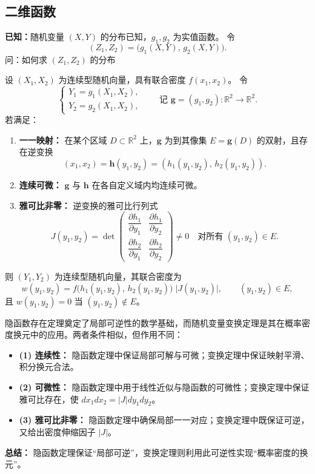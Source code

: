 \subsection{二维函数}
\textbf{已知：}随机变量 $(X,Y)$ 的分布已知，$g_1,g_2$ 为实值函数。
令
\[
(Z_1,Z_2) = \bigl(g_1(X,Y),\, g_2(X,Y)\bigr).
\]
问：如何求 $(Z_1,Z_2)$ 的分布
\begin{theorem}[换元的条件与操作]
设 $(X_1,X_2)$ 为连续型随机向量，具有联合密度 $f(x_1,x_2)$。
令
\[
\begin{cases}
Y_1 = g_1(X_1,X_2),\\
Y_2 = g_2(X_1,X_2),
\end{cases}
\qquad
\text{记 } \mathbf{g}=(g_1,g_2):\mathbb{R}^2\to\mathbb{R}^2.
\]
若满足：
\begin{enumerate}[(1)]
  \item \textbf{一一映射：} 在某个区域 $D\subset\mathbb{R}^2$ 上，$\mathbf{g}$ 为到其像集 $E=\mathbf{g}(D)$ 的双射，且存在逆变换
  \[
  (x_1,x_2)=\mathbf{h}(y_1,y_2)=(h_1(y_1,y_2),\,h_2(y_1,y_2)).
  \]
  \item \textbf{连续可微：} $\mathbf{g}$ 与 $\mathbf{h}$ 在各自定义域内均连续可微。
  \item \textbf{雅可比非零：} 逆变换的雅可比行列式
  \[
  J(y_1,y_2)=
  \det
  \begin{pmatrix}
    \dfrac{\partial h_1}{\partial y_1} & \dfrac{\partial h_1}{\partial y_2}\\[8pt]
    \dfrac{\partial h_2}{\partial y_1} & \dfrac{\partial h_2}{\partial y_2}
  \end{pmatrix}
  \neq 0 \quad \text{对所有 } (y_1,y_2)\in E.
  \]
\end{enumerate}
则 $(Y_1,Y_2)$ 为连续型随机向量，其联合密度为
\[
w(y_1,y_2)
= f\!\big(h_1(y_1,y_2),\,h_2(y_1,y_2)\big)\;\big|J(y_1,y_2)\big|,
\qquad (y_1,y_2)\in E,
\]
且 $w(y_1,y_2)=0$ 当 $(y_1,y_2)\notin E$。
\end{theorem}
\begin{note}
隐函数存在定理奠定了局部可逆性的数学基础，而随机变量变换定理是其在概率密度换元中的应用。两者条件相似，但作用不同：

\begin{itemize}
  \item \textbf{(1) 连续性：}  
  隐函数定理中保证局部可解与可微；变换定理中保证映射平滑、积分换元合法。

  \item \textbf{(2) 可微性：}  
  隐函数定理中用于线性近似与隐函数的可微性；变换定理中保证雅可比存在，使 $dx_1dx_2=|J|dy_1dy_2$。

  \item \textbf{(3) 雅可比非零：}  
  隐函数定理中确保局部一一对应；变换定理中既保证可逆，又给出密度伸缩因子 $|J|$。
\end{itemize}

\textbf{总结：}  
隐函数定理保证“局部可逆”，变换定理则利用此可逆性实现“概率密度的换元”。
\end{note}

